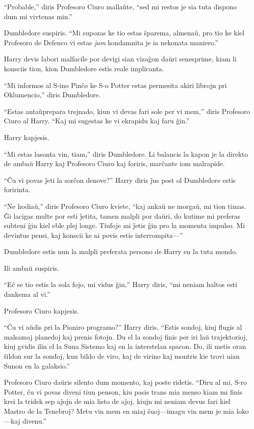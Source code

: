 ``Probable,'' diris Profesoro Ciuro mallaŭte, ``sed mi restos je sia
tuta dispono dum mi vivtenas min.''

Dumbledore suspiris. ``Mi supozas ke tio estas ŝparema, almenaŭ, pro
tio ke kiel Profesoro de Defenco vi estas \emph{jam} kondamnita je ia
nekonata maniero.''

Harry devis labori malfacile por devigi sian vizaĝon daŭri senesprime,
kiam li konsciis tion, kion Dumbledore estis reale implicanta.

``Mi informos al S-ino Pinĉo ke S-o Potter estas permesita akiri librojn pri Oklumencio,'' diris Dumbledore.

``Estas antaŭprepara trejnado, kiun vi devas fari sole per vi mem,''
diris Profesoro Ciuro al Harry. ``Kaj mi sugestas ke vi ekrapidu kaj
faru ĝin.''

Harry kapjesis.

``Mi estas lasonta vin, tiam,'' diris Dumbledore. Li balancis la kapon
je la direkto de ambaŭ Harry kaj Profesoro Ciuro kaj foriris, marĉante
iom malrapide.

``Ĉu vi povas ĵeti la sorĉon denove?'' Harry diris ĵus post ol
Dumbledore estis foririnta.

``Ne hodiaŭ,'' diris Profesoro Ciuro kviete, ``kaj ankaŭ ne morgaŭ, mi
tion timas. Ĝi lacigas multe por esti ĵetita, tamen malpli por daŭri,
do kutime mi preferas subteni ĝin kiel eble plej longe. Tiufoje mi
ĵetis ĝin pro la momenta impulso. Mi devintus pensi, kaj konscii ke ni
povis estis interrompita—''

Dumbledore estis nun la malpli preferata persono de Harry en la tuta mondo.

Ili ambaŭ suspiris.

``Eĉ se tio estis la sola fojo, mi vidus ĝin,'' Harry diris, ``mi neniam haltos esti dankema al vi.''

Profesoro Ciuro kapjesis.

``Ĉu vi aŭdis pri la Pioniro programo?'' Harry diris. ``Estis sondoj,
kiuj flugis al malsamaj planedoj kaj prenis fotojn. Du el la sondoj
finis per iri laŭ trajektorioj, kiuj gvidis ilin el la Suna Sistemo
kaj en la interstelan spacon. Do, ili metis oran ŝildon sur la sondoj,
kun bildo de viro, kaj de virino kaj montris kie trovi nian Sunon en
la galaksio.''

Profesoro Ciuro daŭris silento dum momento, kaj poste ridetis. ``Diru
al mi, S-ro Potter, ĉu vi povas diveni tiun penson, kiu pasis trans
mia menso kiam mi finis krei la tridek sep aĵojn de mia listo de
aĵoj, kiujn mi neniam devus fari kiel Mastro de la Tenebroj? Metu vin
mem en miaj ŝuoj—imagu vin mem je mia loko—kaj divenu.'' 

